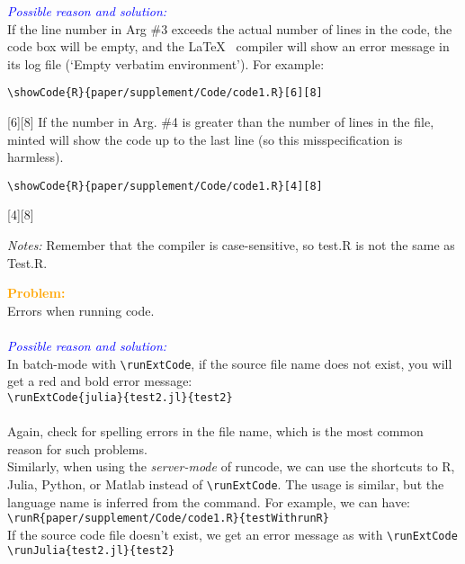\documentclass[a4paper,10pt]{article}
\newcommand{\prob}[1] {\bigskip\noindent\textbf{\textcolor{orange}{Problem:}}\\#1\\\\}
\newcommand{\cause}[1] {\noindent\textit{\textcolor{blue}{Possible reason and solution:}}\\#1}
\newcommand{\cmnt}[1] {\bigskip\noindent\textit{Notes:} #1}
\begin{document}
\cause\bgroup
If the line number in Arg \#3 exceeds the actual number of lines in the code, the code box will be empty, and the \LaTeX~ compiler will show an error message in its log file (`Empty verbatim environment'). For example:
\begin{verbatim}\showCode{R}{paper/supplement/Code/code1.R}[6][8]
\end{verbatim}
[6][8]
\vspace{-2em}\noindent If the number in Arg. \#4 is greater than the number of lines in the file, minted will show the code up to the last line (so this misspecification is harmless).
\begin{verbatim}\showCode{R}{paper/supplement/Code/code1.R}[4][8]
\end{verbatim}
[4][8]
\egroup

\cmnt{Remember that the compiler is case-sensitive, so test.R is not the same as Test.R.}




\prob{Errors when running code.}
\cause\bgroup
In batch-mode with \verb|\runExtCode|, if the source file name does not exist, you will get a red and bold error message:\\
\verb|\runExtCode{julia}{test2.jl}{test2}|\\
\\
Again, check for spelling errors in the file name, which is the most common reason for such problems.\\

\noindent Similarly, when using the \textit{server-mode} of runcode, we can use the shortcuts to R, Julia, Python, or Matlab instead of \verb|\runExtCode|. The usage is similar, but the language name is inferred from the command. For example, we can have:\\
\verb|\runR{paper/supplement/Code/code1.R}{testWithrunR}|
\\
If the source code file doesn't exist, we get an error message as with \verb|\runExtCode|\\
\verb|\runJulia{test2.jl}{test2}|\\
\\
\egroup
\end{document}
